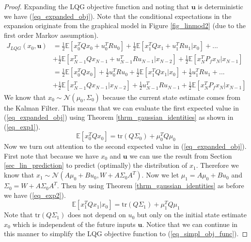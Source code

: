 \begin{proof}
Expanding the LQG objective function and noting that $\mathbf{u}$ is deterministic we have (\ref{eq_expanded_obj}). Note that the conditional expectations in the expansion originate from the graphical model in Figure \ref{fig_linmod2} (due to the first order Markov assumption). 
\begin{equation}
\begin{aligned}
J_{LQG}(x_0, \mathbf{u}) &= \frac{1}{2} \mathbb{E}\left[x_0^TQx_0 + u_0^TRu_0 \right] + \frac{1}{2} \mathbb{E}\left[x_1^TQx_1 + u_1^TRu_1 |x_0\right] + ... \\ &+ \frac{1}{2} \mathbb{E}\left[x_{N-1}^TQx_{N-1} + u_{N-1}^TRu_{N-1}|x_{N-2} \right] + \frac{1}{2} \mathbb{E}\left[x_N^TP_fx_N|x_{N-1} \right] \\
&= \frac{1}{2} \mathbb{E}\left[x_0^TQx_0\right] +\frac{1}{2} u_0^TRu_0 + \frac{1}{2} \mathbb{E}\left[x_1^TQx_1|x_0\right] + \frac{1}{2}u_1^TRu_1 + ... \\ &+ \frac{1}{2} \mathbb{E}\left[x_{N-1}^TQx_{N-1}|x_{N-2} \right]+ \frac{1}{2}u_{N-1}^TRu_{N-1} + \frac{1}{2} \mathbb{E}\left[x_N^TP_fx_N |x_{N-1}\right]
\end{aligned}
\label{eq_expanded_obj}
\end{equation}
We know that $x_0\sim \mathcal{N}(\mu_0, \Sigma_0)$ because the current state estimate comes from the Kalman Filter. This means that we can evaluate the first expected value in (\ref{eq_expanded_obj}) using Theorem \ref{thrm_gaussian_identities} as shown in (\ref{eq_exp1}).
\begin{equation}
\mathbb{E}\left[x_0^TQx_0\right] = \text{tr}(Q\Sigma_0) + \mu_0^TQ\mu_0
\label{eq_exp1}
\end{equation} 
Now we turn out attention to the second expected value in (\ref{eq_expanded_obj}). First note that because we have $x_0$ and $\mathbf{u}$ we can use the result from Section \ref{sec_lin_prediction} to predict (optimally) the distribution of $x_1$. Therefore we know that $x_1 \sim \mathcal{N}(A\mu_0+Bu_0, W+A\Sigma_0 A^T)$. Now we let $\mu_1 = A\mu_0+Bu_0$ and $\Sigma_0 = W+A\Sigma_0 A^T$. Then by using Theorem \ref{thrm_gaussian_identities} as before we have (\ref{eq_exp2}).
\begin{equation}
\mathbb{E}\left[x_1^TQx_1|x_0\right] = \text{tr}(Q\Sigma_1) + \mu_1^TQ\mu_1
\label{eq_exp2}
\end{equation} 
Note that $\text{tr}(Q\Sigma_1)$ does not depend on $u_0$ but only on the initial state estimate $x_0$ which is independent of the future inputs $\mathbf{u}$. Notice that we can continue in this manner to simplify the LQG objective function to (\ref{eq_simpl_obj_func}).

\end{proof}
